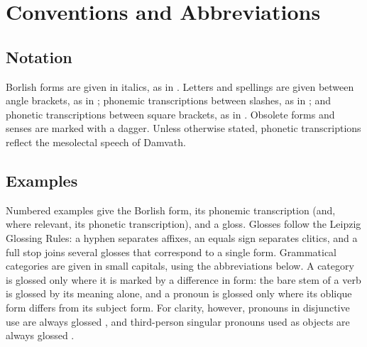 \chapter{Conventions and Abbreviations}\label{ch:conventions}

\section*{Notation}
Borlish forms are given in italics, as in . Letters and spellings are given between angle brackets, as in ; phonemic transcriptions between slashes, as in ; and phonetic transcriptions between square brackets, as in . Obsolete forms and senses are marked with a dagger\obs. Unless otherwise stated, phonetic transcriptions reflect the mesolectal speech of Damvath.

\section*{Examples}
Numbered examples give the Borlish form, its phonemic transcription (and, where relevant, its phonetic transcription), and a gloss. Glosses follow the Leipzig Glossing Rules: a hyphen separates affixes, an equals sign separates clitics, and a full stop joins several glosses that correspond to a single form. Grammatical categories are given in small capitals, using the abbreviations below. A category is glossed only where it is marked by a difference in form: the bare stem of a verb is glossed by its meaning alone, and a pronoun is glossed \Obl{} only where its oblique form differs from its subject form. For clarity, however, pronouns in disjunctive use are always glossed \Dsj{}, and third-person singular pronouns used as objects are always glossed \Acc{}.

\printnoidxglossary[type=\leipzigtype,style=long,nonumberlist,title={Glossing abbreviations}]
